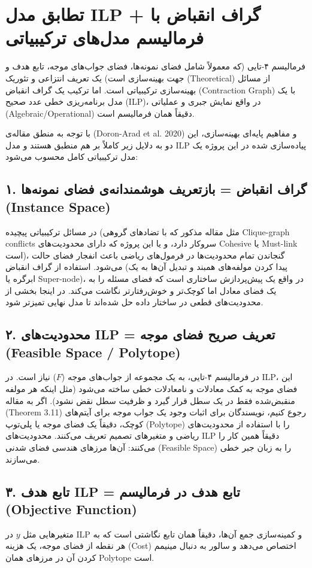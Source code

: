 \documentclass[12pt,a4paper]{article}
\begin{document}
\section*{تطابق مدل ILP + گراف انقباض با فرمالیسم مدل‌های ترکیبیاتی}

فرمالیسم ۴-تایی (که معمولاً شامل فضای نمونه‌ها، فضای جواب‌های موجه، تابع هدف و جهت بهینه‌سازی است) یک تعریف انتزاعی و تئوریک (Theoretical) از مسائل بهینه‌سازی ترکیبیاتی است. اما ترکیب یک گراف انقباض (Contraction Graph) با یک مدل برنامه‌ریزی خطی عدد صحیح (ILP)، در واقع نمایش جبری و عملیاتی (Algebraic/Operational) دقیقاً همان فرمالیسم است.

با توجه به منطق مقاله‌ی (Doron-Arad et al. 2020) و مفاهیم پایه‌ای بهینه‌سازی، این دو به دلایل زیر کاملاً بر هم منطبق هستند و مدل ILP پیاده‌سازی شده در این پروژه یک مدل ترکیبیاتی کامل محسوب می‌شود:

\subsection*{۱. گراف انقباض = بازتعریف هوشمندانه‌ی فضای نمونه‌ها (Instance Space)}
در مسائل ترکیبیاتی پیچیده (مثل مقاله مذکور که با تضادهای گروهی Clique-graph conflicts سروکار دارد، و یا این پروژه که دارای محدودیت‌های Cohesive یا Must-link است)، گنجاندن تمام محدودیت‌ها در فرمول‌های ریاضی باعث انفجار فضای حالت می‌شود. استفاده از گراف انقباض (پیدا کردن مولفه‌های همبند و تبدیل آن‌ها به یک ابرگره یا Super-node)، در واقع یک پیش‌پردازش ساختاری است که فضای مسئله را به یک فضای معادل اما کوچک‌تر و خوش‌رفتارتر نگاشت می‌کند. در اینجا بخشی از محدودیت‌های قطعی در ساختار داده حل شده‌اند تا مدل نهایی تمیزتر شود.

\subsection*{۲. محدودیت‌های ILP = تعریف صریح فضای موجه (Feasible Space / Polytope)}
در فرمالیسم ۴-تایی، به یک مجموعه از جواب‌های موجه ($F$) نیاز است. در ILP، این فضای موجه به کمک معادلات و نامعادلات خطی ساخته می‌شود (مثل اینکه هر مولفه منقبض‌شده فقط در یک سطل قرار گیرد و ظرفیت سطل نقض نشود).
اگر به مقاله (Theorem 3.11) رجوع کنیم، نویسندگان برای اثبات وجود یک جواب موجه برای آیتم‌های کوچک، دقیقاً یک فضای موجه یا پلی‌توپ (Polytope) را با استفاده از محدودیت‌های ریاضی و متغیرهای تصمیم تعریف می‌کنند. محدودیت‌های ILP دقیقاً همین کار را می‌کنند: آن‌ها مرزهای هندسی فضای شدنی (Feasible Space) را به زبان جبر خطی می‌سازند.

\subsection*{۳. تابع هدف ILP = تابع هدف در فرمالیسم (Objective Function)}
متغیرهایی مثل $y$ در ILP و کمینه‌سازی جمع آن‌ها، دقیقاً همان تابع نگاشتی است که به هر نقطه از فضای موجه، یک هزینه (Cost) اختصاص می‌دهد و سالور به دنبال مینیمم کردن آن در مرزهای همان Polytope است.
\end{document}
